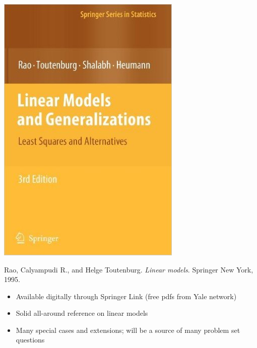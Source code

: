 \begin{frame}[fragile] \frametitle{}

\noindent
\begin{minipage}{0.5\textwidth}
\includegraphics[width=0.9\linewidth]{img/rao.jpg}
\end{minipage}%
\begin{minipage}{0.5\textwidth}
Rao, Calyampudi R., and Helge Toutenburg. {\it Linear models}. Springer New York, 1995. \\
\begin{itemize}
\item Available digitally through Springer Link (free pdfs from Yale network)
\item Solid all-around reference on linear models
\item Many special cases and extensions; will be a source of many problem set questions
\end{itemize}
\end{minipage}

\end{frame}

